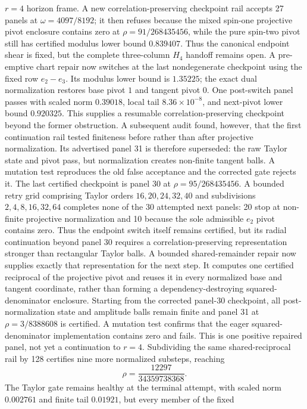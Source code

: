 \documentclass[11pt]{article}
\theoremstyle{definition}
\theoremstyle{remark}
\begin{document}
\(r=4\) horizon frame.  A new correlation-preserving checkpoint rail accepts
27 panels at \(\omega=4097/8192\); it then refuses because the mixed
spin-one projective pivot enclosure contains zero at
\(\rho=91/268435456\), while the pure spin-two pivot still has certified
modulus lower bound \(0.839407\).  Thus the canonical endpoint shear is
fixed, but the complete three-column \(H_4\) handoff remains open.  A
pre-emptive chart repair now switches at the last nondegenerate checkpoint
using the fixed row \(e_2-e_3\).  Its modulus lower bound is \(1.35225\);
the exact dual normalization restores base pivot \(1\) and tangent pivot
\(0\).  One post-switch panel passes with scaled norm \(0.39018\), local
tail \(8.36\times10^{-8}\), and next-pivot lower bound \(0.920325\).
This supplies a resumable correlation-preserving checkpoint beyond the
former obstruction.  A subsequent audit found, however, that the first
continuation rail tested finiteness before rather than after projective
normalization.  Its advertised panel 31 is therefore superseded: the raw
Taylor state and pivot pass, but normalization creates non-finite tangent
balls.  A mutation test reproduces the old false acceptance and the
corrected gate rejects it.  The last certified checkpoint is panel 30 at
\(\rho=95/268435456\).  A bounded retry grid comprising Taylor orders
\(16,20,24,32,40\) and subdivisions \(2,4,8,16,32,64\) completes none of
the 30 attempted next panels: 20 stop at non-finite projective
normalization and 10 because the sole admissible \(e_2\) pivot contains
zero.  Thus the endpoint switch itself remains certified, but its radial
continuation beyond panel 30 requires a correlation-preserving
representation stronger than rectangular Taylor balls.  A bounded
shared-remainder repair now supplies exactly that representation for the
next step.  It computes one certified reciprocal of the projective pivot and
reuses it in every normalized base and tangent coordinate, rather than
forming a dependency-destroying squared-denominator enclosure.  Starting
from the corrected panel-30 checkpoint, all post-normalization state and
amplitude balls remain finite and panel 31 at
\(\rho=3/8388608\) is certified.  A mutation test confirms that the eager
squared-denominator implementation contains zero and fails.  This is one
positive repaired panel, not yet a continuation to \(r=4\).  Subdividing
the same shared-reciprocal rail by 128 certifies nine more normalized
substeps, reaching
\[
 \rho=\frac{12297}{34359738368}.
\]
The Taylor gate remains healthy at the terminal attempt, with scaled norm
\(0.002761\) and finite tail \(0.01921\), but every member of the fixed
\end{document}

